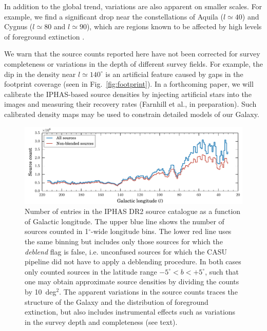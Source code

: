 \documentclass[useAMS,usenatbib]{mn2e}
\def\deg{$^{\circ}$}
\begin{document}
In addition to the global trend,
variations are also apparent on smaller scales.
For example, we find a significant drop near the constellations 
of Aquila ($l\simeq40$) and Cygnus ($l\simeq80$ and $l\simeq90$),
which are regions known to be affected
by high levels of foreground extinction
\citep[known as `the Great Rift', e.g.][]{BokBok}.

We warn that the source counts reported here 
have not been corrected for survey completeness
or variations in the depth of different survey fields.
For example, the dip in the density near $l\simeq140^\circ$
is an artificial feature caused by gaps
in the footprint coverage (seen in Fig.~\ref{fig:footprint}).
In a forthcoming paper,
we will calibrate the IPHAS-based source densities
by injecting artificial stars into the images
and measuring their recovery rates
(Farnhill et al., in preparation).
Such calibrated density maps may be used 
to constrain detailed models of our Galaxy.

\begin{figure}
    \includegraphics[width=\textwidth]{figures/sourcecount/sourcecount.pdf} 
    \caption{Number of entries in the IPHAS DR2 source catalogue
    as a function of Galactic longitude.
    The upper blue line shows the number of sources
    counted in 1\deg-wide longitude bins.
    The lower red line uses the same binning
    but includes only those sources 
    for which the \emph{deblend} flag is {\sc false}, 
    i.e. unconfused sources for which the CASU pipeline
    did not have to apply a deblending procedure.
    In both cases only counted sources
    in the latitude range $-5^\circ<b<+5^\circ$,
    such that one may obtain approximate source densities
    by dividing the counts by 10~deg$^2$.
    The apparent variations in the source counts
    traces the structure of the Galaxy
    and the distribution of foreground extinction,
    but also includes instrumental effects
	such as variations in the survey depth
	and completeness (see text).
   }
    \label{fig:sourcecount}
\end{figure}
\end{document}
